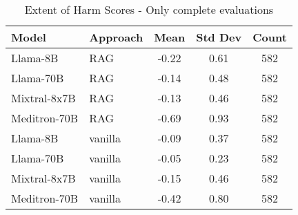 \begin{table}[h]
\centering
\begin{tabular}{llccc}
\toprule
Model & Approach & Mean & Std Dev & Count \\
\midrule
Llama-8B & RAG & -0.22 & 0.61 & 582 \\
Llama-70B & RAG & -0.14 & 0.48 & 582 \\
Mixtral-8x7B & RAG & -0.13 & 0.46 & 582 \\
Meditron-70B & RAG & -0.69 & 0.93 & 582 \\
Llama-8B & vanilla & -0.09 & 0.37 & 582 \\
Llama-70B & vanilla & -0.05 & 0.23 & 582 \\
Mixtral-8x7B & vanilla & -0.15 & 0.46 & 582 \\
Meditron-70B & vanilla & -0.42 & 0.80 & 582 \\
\bottomrule
\end{tabular}
\caption{Extent of Harm Scores - Only complete evaluations}
\label{tab:extent_of_harm_complete}
\end{table}